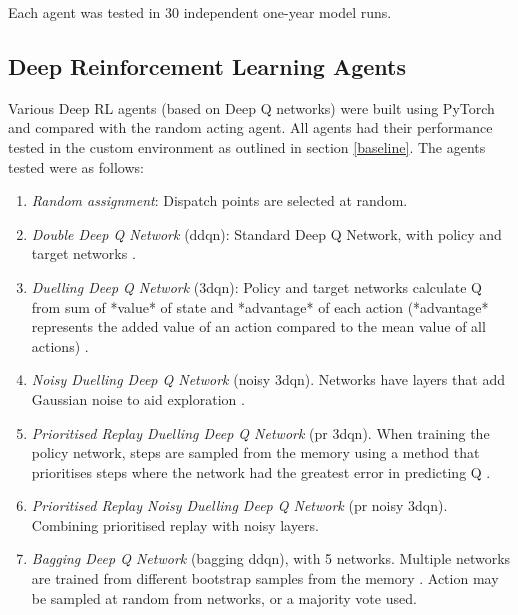 \documentclass{article}
\begin{document}
Each agent was tested in 30 independent one-year model runs.

\subsection{Deep Reinforcement Learning Agents}

Various Deep RL agents (based on Deep Q networks) were built using PyTorch and compared with the random acting agent. All agents had their performance tested in the custom environment as outlined in section \ref{baseline}. The agents tested were as follows:

\begin{enumerate}

    \item \emph{Random assignment}: Dispatch points are selected at random.
    
    \item \emph{Double Deep Q Network} (ddqn): Standard Deep Q Network, with policy and target networks \cite{van_hasselt_deep_2015}.
    
    \item \emph{Duelling Deep Q Network} (3dqn): Policy and target networks calculate Q from sum of *value* of state and *advantage* of each action (*advantage* represents the added value of an action compared to the mean value of all actions) \cite{wang_dueling_2016}. 
    
    \item \emph{Noisy Duelling Deep Q Network} (noisy 3dqn). Networks have layers that add Gaussian noise to aid exploration \cite{schaul_prioritized_2016}.
    
    \item \emph{Prioritised Replay Duelling Deep Q Network} (pr 3dqn). When training the policy network, steps are sampled from the memory using a method that prioritises steps where the network had the greatest error in predicting Q \cite{schaul_prioritized_2016}.
    
    \item \emph{Prioritised Replay Noisy Duelling Deep Q Network} (pr noisy 3dqn). Combining prioritised replay with noisy layers.
    
    \item \emph{Bagging Deep Q Network} (bagging ddqn), with 5 networks. Multiple networks are trained from different bootstrap samples from the memory \cite{osband_deep_2016}. Action may be sampled at random from networks, or a majority vote used.
    

\end{enumerate}
\end{document}

